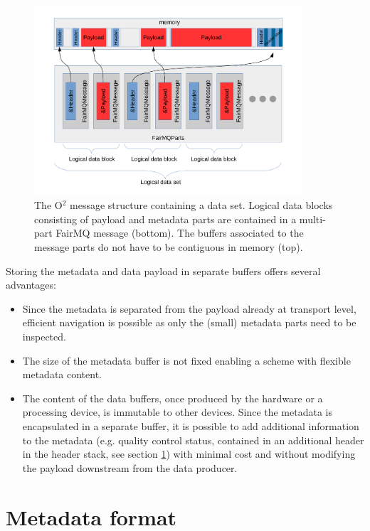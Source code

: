 \documentclass[a4paper,twoside]{article}
\def\O2{O$^2$}
\begin{document}
\begin{figure}[h]
  \centering
  \includegraphics[width=0.89\textwidth]{multipartO2message.pdf}
  \caption{The \O2 message structure containing a data set. Logical data blocks consisting of payload and metadata parts are contained in a multi-part FairMQ message (bottom). The buffers associated to the message parts do not have to be contiguous in memory (top).}
  \label{fig:o2message} 
\end{figure}

Storing the metadata and data payload in separate buffers offers several advantages:

\begin{itemize}
  \item Since the metadata is separated from the payload already at transport level, efficient navigation is possible as only the (small) metadata parts need to be inspected.
  \item The size of the metadata buffer is not fixed enabling a scheme with flexible metadata content.
  \item The content of the data buffers, once produced by the hardware or a processing device, is immutable to other devices. Since the metadata is encapsulated in a separate buffer, it is possible to add additional information to the metadata (e.g. quality control status, contained in an additional header in the header stack, see section \ref{sec:header}) with minimal cost and without modifying the payload downstream from the data producer.
\end{itemize}

\section{Metadata format}\label{sec:header}
\end{document}
